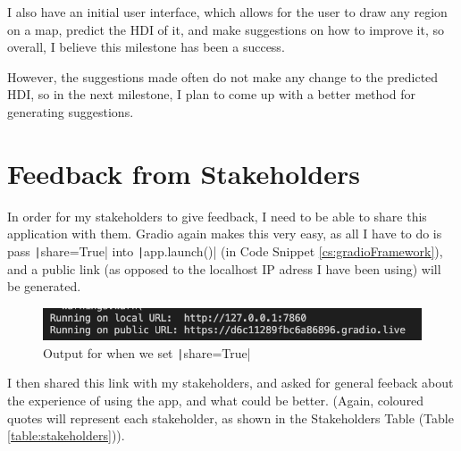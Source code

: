 \documentclass[12pt]{report}
\newcommand{\pil}[1]{\protect\texttt|#1|}
\begin{document}
I also have an initial user interface, which allows for the user to draw any region on a map, predict the HDI of it, and make suggestions on how to improve it, so overall, I believe this milestone has been a success.

However, the suggestions made often do not make any change to the predicted HDI, so in the next milestone, I plan to come up with a better method for generating suggestions.

\section{Feedback from Stakeholders}
In order for my stakeholders to give feedback, I need to be able to share this application with them. Gradio again makes this very easy, as all I have to do is pass \pil{share=True} into \pil{app.launch()} (in Code Snippet \ref{cs:gradioFramework}), and a public link (as opposed to the localhost IP adress I have been using) will be generated.

\begin{figure}[H]
\centering
\includegraphics[width=14cm]{shareTrue.png}
\caption{Output for when we set \pil{share=True}}\label{fig:shareTrue}
\end{figure}

I then shared this link with my stakeholders, and asked for general feeback about the experience of using the app, and what could be better. (Again, coloured quotes will represent each stakeholder, as shown in the Stakeholders Table (Table \ref{table:stakeholders})).
\end{document}
